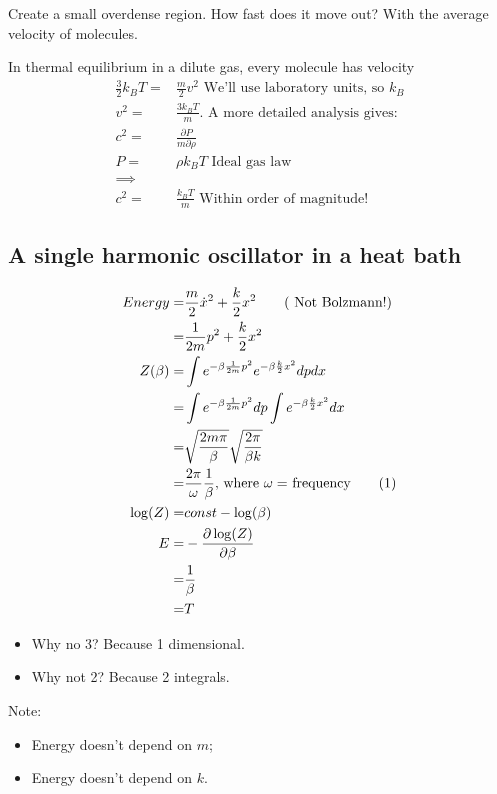 \documentclass[]{article}
\newcommand\numberthis{\addtocounter{equation}{1}\tag{\theequation}}
\begin{document}
Create a small overdense region. How fast does it move out? With the average velocity of molecules.

In thermal equilibrium in a dilute gas, every molecule has velocity
\begin{align*}
\frac{3}{2} k_B T =& \frac{m}{2} v^2\text{ We'll use laboratory units, so $k_B$}\\
v^2 =& \frac{3 k_B T}{m}\text{. A more detailed analysis gives:}\\
c^2 =& \frac{\partial P}{m \partial \rho}\\
P =& \rho k_B T\text{ Ideal gas law}\\
\implies&\\
c^2 =& \frac{k_B T}{m}\text{ Within order of magnitude!}
\end{align*}


\subsection{A single harmonic oscillator in a heat bath}

\begin{align*}
Energy =& \frac{m}{2} \dot{x}^ 2 + \frac{k}{2} x^2\tag{ Not Bolzmann!}\\
=& \frac{1}{2m} p^ 2 + \frac{k}{2} x^2\\
Z(\beta) =& \int e^{-\beta \frac{1}{2m} p^ 2 } e^{-\beta \frac{k}{2} x^2} dp dx\\
=& \int e^{-\beta \frac{1}{2m} p^ 2 } dp \int e^{-\beta \frac{k}{2} x^2} dx\\
=& \sqrt{\frac{2m\pi}{\beta}}\sqrt{\frac{2 \pi}{\beta k}}\\
=& \frac{2 \pi}{\omega}\frac{1}{\beta}\text{, where $\omega=$ frequency}\numberthis\label{eq:Z:classical:q}\\
\log(Z) =& const - \log(\beta)\\
E =& - \frac{\partial \log(Z)}{\partial \beta}\\
=& \frac{1}{\beta}\\
=& T
\end{align*}

\begin{itemize}
	\item Why no 3? Because 1 dimensional.
	\item Why not 2? Because 2 integrals.
\end{itemize}

Note:
\begin{itemize}
	\item Energy doesn't depend on $m$;
	\item Energy doesn't depend on $k$.
\end{itemize}
\end{document}
